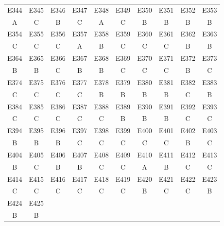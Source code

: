 \documentclass[withoutpreface,bwprint]{cumcmthesis} %
\begin{document}
\begin{appendices}
\begin{table}[h]
	\begin{center}
		\begin{tabular}{|c|c|c|c|c|c|c|c|c|c|}
			\hline
			E344 & E345 & E346 & E347 & E348 & E349 & E350 & E351 & E352 & E353 \\ 
			A & C & B & C & A & C & B & B & B & B \\ \hline
			E354 & E355 & E356 & E357 & E358 & E359 & E360 & E361 & E362 & E363 \\ 
			C & C & C & A & B & C & C & C & B & B \\ \hline
			E364 & E365 & E366 & E367 & E368 & E369 & E370 & E371 & E372 & E373 \\ 
			B & B & C & B & B & C & C & C & B & C \\ \hline
			E374 & E375 & E376 & E377 & E378 & E379 & E380 & E381 & E382 & E383 \\ 
			C & C & C & C & B & B & B & B & C & B \\ \hline
			E384 & E385 & E386 & E387 & E388 & E389 & E390 & E391 & E392 & E393 \\ 
			C & C & C & C & C & B & B & B & C & C \\ \hline
			E394 & E395 & E396 & E397 & E398 & E399 & E400 & E401 & E402 & E403 \\ 
			B & B & B & C & C & C & C & C & B & C \\ \hline
			E404 & E405 & E406 & E407 & E408 & E409 & E410 & E411 & E412 & E413 \\ 
			B & C & B & B & C & C & A & B & C & C \\ \hline
			E414 & E415 & E416 & E417 & E418 & E419 & E420 & E421 & E422 & E423 \\ 
			C & C & C & C & C & C & B & C & C & B \\ \hline
			E424 & E425 & & & & & & & & \\ 
			B & B & & & & & & & & \\ \hline
		\end{tabular}
	\end{center}
\end{table}

 
\end{appendices}
\end{document}
